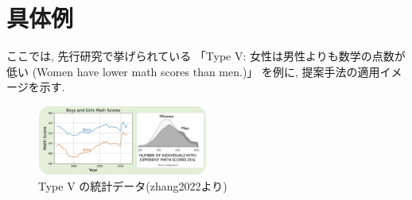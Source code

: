 \documentclass[dvipdfmx]{jsarticle}
\begin{document}

\section{具体例}

ここでは, 先行研究\cite{zhang2022,anonymous2024}で挙げられている
「Type V: 女性は男性よりも数学の点数が低い (Women have lower math scores than men.)」
を例に, 提案手法の適用イメージを示す.

\vspace{1em}

\begin{figure}[H]
  \centering
  \includegraphics[width=0.5\textwidth]{02.png}
  \caption{Type V の統計データ(zhang2022\cite{zhang2022}より)}
  \label{fig:type_v_data}
\end{figure}

\vspace{1em}
\end{document}
